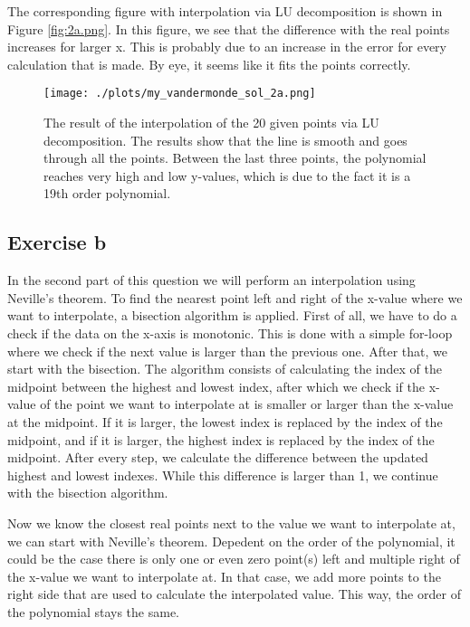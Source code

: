 

The corresponding figure with interpolation via LU decomposition is shown in Figure \ref{fig:2a.png}. In this figure, we see that the difference with the real points increases for larger x. This is probably due to an increase in the error for every calculation that is made. By eye, it seems like it fits the points correctly. 

\begin{figure}[h!]
  \centering
  \texttt{[image: ./plots/my\_vandermonde\_sol\_2a.png]}
  \caption{The result of the interpolation of the 20 given points via LU decomposition. The results show that the line is smooth and goes through all the points. Between the last three points, the polynomial reaches very high and low y-values, which is due to the fact it is a 19th order polynomial.}
  \label{fig:2a}
\end{figure}

\subsection{Exercise b}
In the second part of this question we will perform an interpolation using Neville's theorem. To find the nearest point left and right of the x-value where we want to interpolate, a bisection algorithm is applied. First of all, we have to do a check if the data on the x-axis is monotonic. This is done with a simple for-loop where we check if the next value is larger than the previous one. After that, we start with the bisection.
The algorithm consists of calculating the index of the midpoint between the highest and lowest index, after which we check if the x-value of the point we want to interpolate at is smaller or larger than the x-value at the midpoint. If it is larger, the lowest index is replaced by the index of the midpoint, and if it is larger, the highest index is replaced by the index of the midpoint. After every step, we calculate the difference between the updated highest and lowest indexes. While this difference is larger than 1, we continue with the bisection algorithm. 

Now we know the closest real points next to the value we want to interpolate at, we can start with Neville's theorem. Depedent on the order of the polynomial, it could be the case there is only one or even zero point(s) left and multiple right of the x-value we want to interpolate at. In that case, we add more points to the right side that are used to calculate the interpolated value. This way, the order of the polynomial stays the same.

